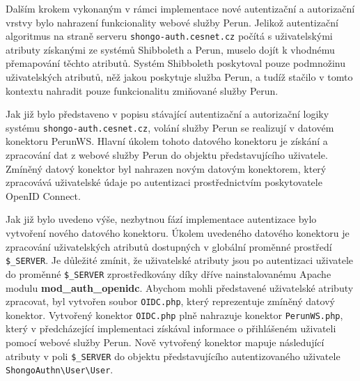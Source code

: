 \documentclass[
  printed, %
  twoside, %
  table,   %
  nolof,     %
  nolot,     %
]{fithesis3}
\begin{document}
\par 
Dalším krokem vykonaným v rámci implementace nové autentizační a autorizační vrstvy bylo nahrazení funkcionality webové služby Perun.  
Jelikož autentizační algoritmus na straně serveru \texttt{shongo-auth.cesnet.cz} počítá s uživatelskými atributy získanými ze systémů Shibboleth a Perun, muselo dojít k vhodnému přemapování těchto atributů. Systém Shibboleth poskytoval pouze podmnožinu uživatelských atributů, něž jakou poskytuje služba Perun, a tudíž stačilo v tomto kontextu nahradit pouze funkcionalitu zmiňované služby Perun. \par

Jak již bylo představeno v popisu stávající autentizační a autorizační logiky systému \texttt{shongo-auth.cesnet.cz}, volání služby Perun se realizují v datovém konektoru PerunWS. Hlavní úkolem tohoto datového konektoru je získání a zpracování dat z webové služby Perun do objektu představujícího uživatele. Zmíněný datový konektor byl nahrazen novým datovým konektorem, který zpracovává uživatelské údaje po autentizaci prostřednictvím poskytovatele OpenID Connect. 
\par

Jak již bylo uvedeno výše, nezbytnou fází implementace autentizace bylo vytvoření nového datového konektoru. Úkolem uvedeného datového konektoru je zpracování uživatelských atributů dostupných v globální proměnné prostředí \texttt{\$\_SERVER}. Je důležité zmínit, že uživatelské atributy jsou po autentizaci uživatele do proměnné \texttt{\$\_SERVER} zprostředkovány díky dříve nainstalovanému Apache modulu \textbf{mod\_auth\_openidc}. Abychom mohli představené uživatelské atributy zpracovat, byl vytvořen soubor \texttt{OIDC.php}, který reprezentuje zmíněný datový konektor. Vytvořený konektor \texttt{OIDC.php} plně nahrazuje konektor \texttt{PerunWS.php}, který v předcházející implementaci získával informace o přihlášeném uživateli pomocí webové služby Perun. Nově vytvořený konektor mapuje následující atributy v poli \texttt{\$\_SERVER} do objektu představujícího autentizovaného uživatele \texttt{ShongoAuthn\textbackslash User\textbackslash User}. 
\end{document}
